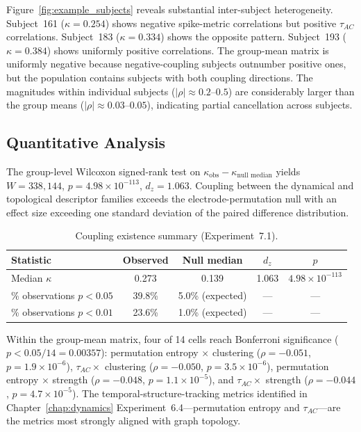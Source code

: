 Figure~\ref{fig:example_subjects} reveals substantial inter-subject heterogeneity. Subject~161 ($\kappa = 0.254$) shows negative spike-metric correlations but positive $\tau_{AC}$ correlations. Subject~183 ($\kappa = 0.334$) shows the opposite pattern. Subject~193 ($\kappa = 0.384$) shows uniformly positive correlations. The group-mean matrix is uniformly negative because negative-coupling subjects outnumber positive ones, but the population contains subjects with both coupling directions. The magnitudes within individual subjects ($|\rho| \approx 0.2$--$0.5$) are considerably larger than the group means ($|\rho| \approx 0.03$--$0.05$), indicating partial cancellation across subjects.

\subsection{Quantitative Analysis}

The group-level Wilcoxon signed-rank test on $\kappa_{\text{obs}} - \kappa_{\text{null median}}$ yields $W = 338{,}144$, $p = 4.98 \times 10^{-113}$, $d_z = 1.063$. Coupling between the dynamical and topological descriptor families exceeds the electrode-permutation null with an effect size exceeding one standard deviation of the paired difference distribution.

\begin{table}[htbp]
\centering
\caption{Coupling existence summary (Experiment~7.1).}
\label{tab:coupling_existence}
\small
\begin{tabular}{lcccc}
\toprule
\textbf{Statistic} & \textbf{Observed} & \textbf{Null median} & \textbf{$d_z$} & \textbf{$p$} \\
\midrule
Median $\kappa$ & 0.273 & 0.139 & 1.063 & $4.98 \times 10^{-113}$ \\
\% observations $p < 0.05$ & 39.8\% & 5.0\% (expected) & --- & --- \\
\% observations $p < 0.01$ & 23.6\% & 1.0\% (expected) & --- & --- \\
\bottomrule
\end{tabular}
\end{table}

Within the group-mean matrix, four of 14 cells reach Bonferroni significance ($p < 0.05/14 = 0.00357$): permutation entropy $\times$ clustering ($\rho = -0.051$, $p = 1.9 \times 10^{-6}$), $\tau_{AC} \times$ clustering ($\rho = -0.050$, $p = 3.5 \times 10^{-6}$), permutation entropy $\times$ strength ($\rho = -0.048$, $p = 1.1 \times 10^{-5}$), and $\tau_{AC} \times$ strength ($\rho = -0.044$, $p = 4.7 \times 10^{-5}$). The temporal-structure-tracking metrics identified in Chapter~\ref{chap:dynamics} Experiment~6.4---permutation entropy and $\tau_{AC}$---are the metrics most strongly aligned with graph topology.

